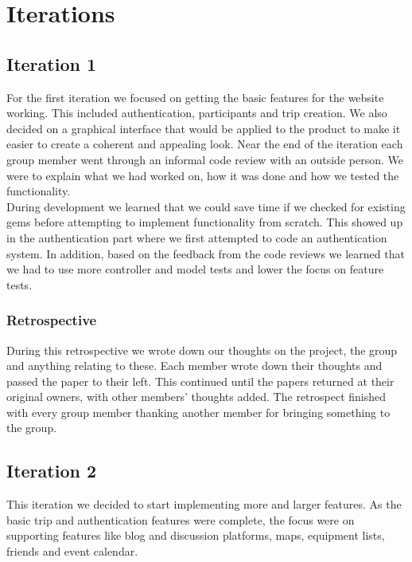 \documentclass[a4paper]{article}
\begin{document}
\section{Iterations}
\subsection{Iteration 1}
For the first iteration we focused on getting the basic features for the website working. This included authentication, participants and trip creation. We also decided on a graphical interface that would be applied to the product to make it easier to create a coherent and appealing look. Near the end of the iteration each group member went through an informal code review with an outside person. We were to explain what we had worked on, how it was done and how we tested the functionality.\\

\noindent
During development we learned that we could save time if we checked for existing gems before attempting to implement functionality from scratch. This showed up in the authentication part where we first attempted to code an authentication system. In addition, based on the feedback from the code reviews we learned that we had to use more controller and model tests and lower the focus on feature tests.

\subsubsection{Retrospective}
During this retrospective we wrote down our thoughts on the project, the group and anything relating to these. Each member wrote down their thoughts and passed the paper to their left. This continued until the papers returned at their original owners, with other members' thoughts added. The retrospect finished with every group member thanking another member for bringing something to the group.

\subsection{Iteration 2}
This iteration we decided to start implementing more and larger features. As the basic trip and authentication features were complete, the focus were on supporting features like blog and discussion platforms, maps, equipment lists, friends and event calendar.
\end{document}
